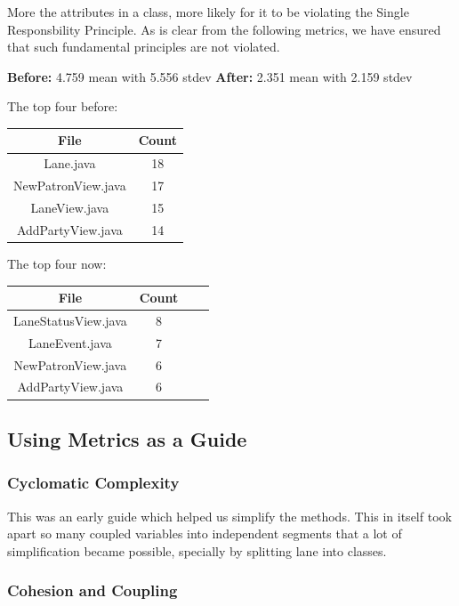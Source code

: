 More the attributes in a class, more likely for it to be violating the Single Responsbility Principle. As is clear from the following metrics, we have ensured that such fundamental principles are not violated.


\textbf{Before:} 4.759 mean with 5.556 stdev
\textbf{After:} 2.351 mean with 2.159 stdev

The top four before:

\begin{tabular}{ |c|c| }
    \hline
    \textbf{File}      & \textbf{Count} \\
    \hline
    Lane.java          & 18             \\
    NewPatronView.java & 17             \\
    LaneView.java      & 15             \\
    AddPartyView.java  & 14             \\
    \hline
\end{tabular}

The top four now:

\begin{tabular}{ |c|c|c|c| }
    \hline
    \textbf{File}       & \textbf{Count} \\
    \hline
    LaneStatusView.java & 8              \\
    LaneEvent.java      & 7              \\
    NewPatronView.java  & 6              \\
    AddPartyView.java   & 6              \\
    \hline
\end{tabular}

\subsection{Using Metrics as a Guide}

\subsubsection{Cyclomatic Complexity}

This was an early guide which helped us simplify the methods. This in itself took apart so many coupled variables into independent segments that a lot of simplification became possible, specially by splitting lane into classes.

\subsubsection{Cohesion and Coupling}

